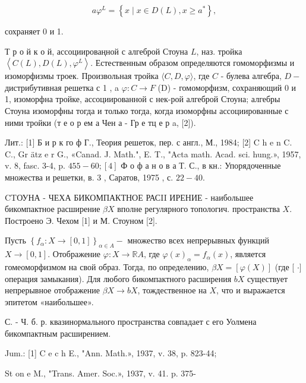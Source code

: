 \documentclass[10pt]{article}
\begin{document}
\[

a \varphi^{L}=\left\{x \mid x \in D(L), x \geqslant a^{*}\right\},

\]



сохраняет 0 и 1.



Т р о й к о й, ассоциироваңной с алгеброй Стоуна $L$, наз. тройка $\left\langle C(L), D(L), \varphi^{L}\right\rangle$. Естественным образом определяются гомоморфизмы и изоморфизмы троек. Произвольная тройка $\langle C, D, \varphi\rangle$, где $C$ - булева алгебра, $D-$ дистрибутивная решетка с 1 , a $\varphi: C \rightarrow F$ (D) - гомоморфизм, сохраняющий 0 и 1, изоморфна тройке, ассоциированной с нек-рой алгеброй Стоуна; алгебры Стоуна изоморфны тогда и только тогда, когда изоморфны ассоциированные с ними тройки (т е о р ем а Чен а - Гр е тц е р a, [2]).



Лит.: [1] Б и р к го ф Г., Теория решеток, пер. с англ., М., 1984; [2] C h e n C. C., Gr ätz e r G., «Canad. J. Math.", E. T., "Acta math. Acad. sci. hung.», 1957, v. 8, fasc. 3-4, p. $455-60 ;[4]$ Ф о ф а н о в а Т. С., в кн.: Упорядоченные множества и решетки, в. 3 , Саратов, 1975 , с. $22-40$.



CTОУНА - ЧЕХА БИКОМПАКТНОЕ РАСII ИРЕНИЕ - наибольшее бикомпактное расширение $\beta X$ вполне регулярного топологич. пространства $X$. Построено Э. Чехом [1] и М. Стоуном [2].



Пусть $\left\{f_{\alpha}: X \rightarrow[0,1]\right\}_{\alpha \in A}-$ множество всех непрерывных функций $X \rightarrow[0,1]$. Отображение $\varphi: X \rightarrow \mathbb{R} A$, где $\varphi(x)_{\alpha}=f_{\alpha}(x)$, является гомеоморфизмом на свой образ. Тогда, по определению, $\beta X=[\varphi(X)]$ (где [ $\cdot]$ операция замыкания). Для любого бикомпактного расширения $b X$ существует непрерывное отображение $\beta X \rightarrow b X$, тождественное на $X$, что и выражается эпитетом «наибольшее».



С. - Ч. б. р. квазинормального пространства совпадает с его Уолмена бикомпактным расширением.



Jum.: [1] C e c h E., "Ann. Math.», 1937, v. 38, p. 823-44;

St on e M., "Trans. Amer. Soc.», 1937, v. 41. p. 375-
\end{document}
